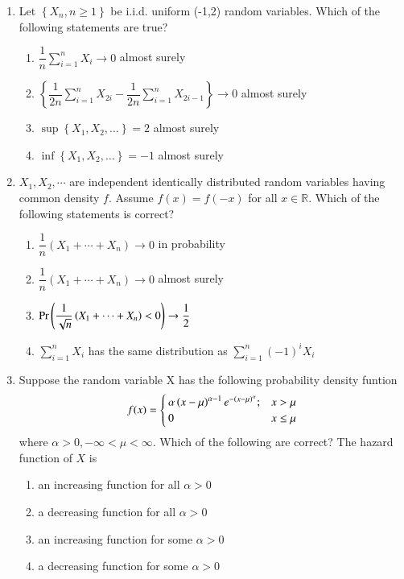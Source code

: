 \begin{enumerate}[label=\thesection.\arabic*.,ref=\thesection.\theenumi]
%
\solution

%
\item Let $\left\{X_{n}, n \geq 1\right\}$ be i.i.d. uniform (-1,2) random variables. Which of the following statements are true?
\begin{enumerate}[label=\alph*)]
\item $\dfrac{1}{n} \sum_{i=1}^{n} X_{i} \rightarrow 0$ almost surely
\item $\left\{\dfrac{1}{2 n} \sum_{i=1}^{n} X_{2 i}-\dfrac{1}{2 n} \sum_{i=1}^{n} X_{2 i-1}\right\}\rightarrow 0$
almost surely
\item $\sup \left\{X_{1}, X_{2}, \ldots\right\}=2$ almost surely
\item $\inf \left\{X_{1}, X_{2}, \ldots\right\}=-1$ almost surely
\end{enumerate}
\solution

%
\item $X_{1}, X_{2}, \cdots$ are independent identically distributed random variables
having common density $f$. Assume $f(x)=f(-x)$ for all $x \in \mathbb{R}$. Which of the following statements is correct?
\begin{enumerate}[label=\alph*)]
\item $\dfrac{1}{n}\left(X_{1}+\cdots+X_{n}\right) \rightarrow 0$ in probability
\item $\dfrac{1}{n}\left(X_{1}+\cdots+X_{n}\right) \rightarrow 0$ almost surely
\item $\Pr\left(\dfrac{1}{\sqrt{n}}\left(X_{1}+\cdots+X_{n}\right)<0\right) \rightarrow \dfrac{1}{2}$
\item $\sum_{i=1}^{n} X_{i}$ has the same distribution as $\sum_{i=1}^{n}(-1)^{i} X_{i}$
\end{enumerate}
%
\solution

\item Suppose the random variable X has the following probability density funtion 
\begin{align}
    f(x)=\begin{cases}\alpha\left(x-\mu\right)^{\alpha -1}e^{-\left(x-\mu\right)^\alpha};&x>\mu\\
                        0                               &x\leq\mu    
    \end{cases}\nonumber
\end{align}
where $\alpha>0,-\infty <\mu<\infty$. Which of the following are correct? The hazard function of $X$ is
\begin{enumerate}
    \item an increasing function for all $\alpha>0$
    \item a decreasing function for all $\alpha >0$
    \item an increasing function for some $\alpha>0$
    \item a decreasing function for some $\alpha>0$
\end{enumerate}
%
\solution



\end{enumerate}
